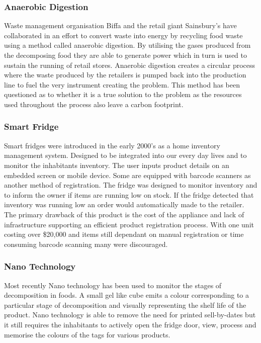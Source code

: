 \documentclass[a4paper, 11pt]{article}
\begin{document}
\subsubsection{Anaerobic Digestion} 
Waste management organisation Biffa and the retail giant Sainsbury's have collaborated in an effort to convert waste into energy by recycling food waste using a method called anaerobic digestion. By utilising the gases produced from the decomposing food they are able to generate power which in turn is used to sustain the running of retail stores. Anaerobic digestion creates a circular process where the waste produced by the retailers is pumped back into the production line to fuel the very instrument creating the problem. This method has been questioned as to whether it is a true solution to the problem as the resources used throughout the process also leave a carbon footprint.\cite{anarobic}

\subsubsection{Smart Fridge} Smart fridges were introduced in the early 2000's as a home inventory management system. Designed to be integrated into our every day lives and to monitor the inhabitants inventory. The user inputs product details on an embedded screen or mobile device. Some are equipped with barcode scanners as another method of registration. The fridge was designed to monitor inventory and to inform the owner if items are running low on stock. If the fridge detected that inventory was running low an order would automatically made to the retailer. The primary drawback of this product is the cost of the appliance and lack of infrastructure supporting an efficient product registration process. With one unit costing over \$20,000 and items still dependant on manual registration or time consuming barcode scanning many were discouraged.\cite{idiotFridge}

\subsubsection{Nano Technology} 
Most recently Nano technology has been used to monitor the stages of decomposition in foods. A small gel like cube emits a colour corresponding to a particular stage of decomposition and visually representing the shelf life of the product. Nano technology is able to remove the need for printed sell-by-dates but it still requires the inhabitants to actively open the fridge door, view, process and memorise the colours of the tags for various products.\cite{nano}
\end{document}
